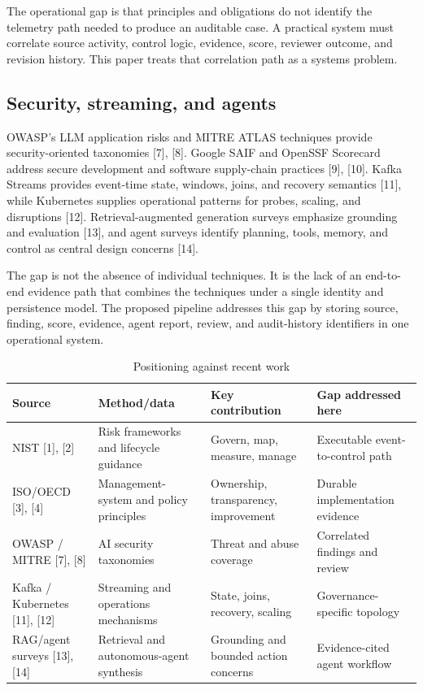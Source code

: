 \documentclass[conference]{IEEEtran}
\begin{document}
The operational gap is that principles and obligations do not identify the telemetry path needed to produce an auditable case. A practical system must correlate source activity, control logic, evidence, score, reviewer outcome, and revision history. This paper treats that correlation path as a systems problem.

\subsection{Security, streaming, and agents}
OWASP's LLM application risks and MITRE ATLAS techniques provide security-oriented taxonomies [7], [8]. Google SAIF and OpenSSF Scorecard address secure development and software supply-chain practices [9], [10]. Kafka Streams provides event-time state, windows, joins, and recovery semantics [11], while Kubernetes supplies operational patterns for probes, scaling, and disruptions [12]. Retrieval-augmented generation surveys emphasize grounding and evaluation [13], and agent surveys identify planning, tools, memory, and control as central design concerns [14].

The gap is not the absence of individual techniques. It is the lack of an end-to-end evidence path that combines the techniques under a single identity and persistence model. The proposed pipeline addresses this gap by storing source, finding, score, evidence, agent report, review, and audit-history identifiers in one operational system.

\begin{table}[t]
\caption{Positioning against recent work}
\label{tab:related}
\centering\scriptsize
\begin{tabular}{p{1.35cm}p{1.55cm}p{2.05cm}p{1.85cm}}
\toprule
\textbf{Source} & \textbf{Method/data} & \textbf{Key contribution} & \textbf{Gap addressed here}\\
\midrule
NIST [1], [2] & Risk frameworks and lifecycle guidance & Govern, map, measure, manage & Executable event-to-control path\\
ISO/OECD [3], [4] & Management-system and policy principles & Ownership, transparency, improvement & Durable implementation evidence\\
OWASP / MITRE [7], [8] & AI security taxonomies & Threat and abuse coverage & Correlated findings and review\\
Kafka / Kubernetes [11], [12] & Streaming and operations mechanisms & State, joins, recovery, scaling & Governance-specific topology\\
RAG/agent surveys [13], [14] & Retrieval and autonomous-agent synthesis & Grounding and bounded action concerns & Evidence-cited agent workflow\\
\bottomrule
\end{tabular}
\end{table}
\end{document}
